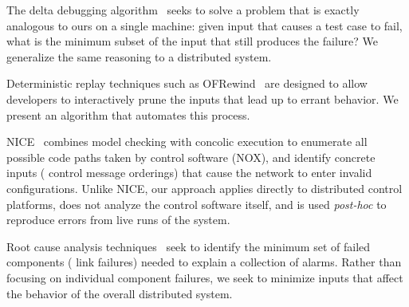 
The delta debugging algorithm~\cite{Zeller:2002:SIF:506201.506206} seeks to solve
a problem that is exactly analogous to ours on a single machine: given input that causes a test case
to fail, what is the minimum subset of the input that still produces the failure?
We generalize the same reasoning to a distributed system.


Deterministic replay techniques such as OFRewind~\cite{ofrewind}
are designed to allow developers to interactively prune
the inputs that lead up to errant behavior. We present an algorithm that
automates this process.


NICE~\cite{nice} combines model checking with concolic execution
to enumerate all possible code paths taken by control software (NOX),
and identify concrete inputs (\eg{} control message orderings) that cause
the network to enter invalid configurations. Unlike NICE, our approach
applies directly to distributed control platforms, does not analyze the
control software itself, and is used {\em post-hoc} to
reproduce errors from live runs of the system.




Root cause analysis techniques~\cite{577079} seek to identify the minimum set of failed
components (\eg{} link failures) needed to explain a collection of alarms. Rather than
focusing on individual component failures, we seek to minimize inputs that affect the behavior
of the overall distributed system.

%

